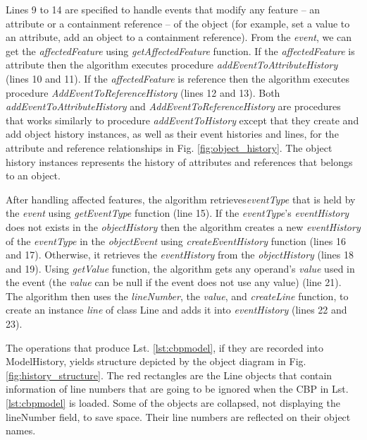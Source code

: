\documentclass[sigconf]{acmart}
\begin{document}
Lines 9 to 14 are specified to handle events that modify any feature -- an attribute or a containment reference -- of the object (for example, set a value to an attribute, add an object to a containment reference). From the \emph{event}, we can get the \emph{affectedFeature} using \emph{getAffectedFeature} function. If the \emph{affectedFeature} is attribute then the algorithm executes procedure \emph{addEventToAttributeHistory} (lines 10 and 11). If the \emph{affectedFeature} is reference then the algorithm executes procedure \emph{AddEventToReferenceHistory} (lines 12 and 13). Both \emph{addEventToAttributeHistory} and \emph{AddEventToReferenceHistory} are procedures that works similarly to procedure \emph{addEventToHistory} except that they create and add object history instances, as well as their event histories and lines, for the attribute and reference relationships in Fig. \ref{fig:object_history}. The object history instances represents the history of attributes and references that belongs to an object.

After handling affected features, the algorithm retrieves\emph{eventType} that is held by the \emph{event} using \emph{getEventType} function (line 15). If the \emph{eventType}'s \emph{eventHistory} does not exists in the \emph{objectHistory} then the algorithm creates a new \emph{eventHistory} of the \emph{eventType} in the \emph{objectEvent}  using \emph{createEventHistory} function (lines 16 and 17). Otherwise, it retrieves the \emph{eventHistory} from the \emph{objectHistory} (lines 18 and 19). Using \emph{getValue} function, the algorithm gets any operand's \emph{value} used in the event (the \emph{value} can be null if the event does not use any value) (line 21). The algorithm then uses the \emph{lineNumber}, the \emph{value}, and \emph{createLine} function, to create an instance \emph{line} of class Line and adds it into \emph{eventHistory} (lines 22 and 23).   

The operations that produce Lst. \ref{lst:cbpmodel}, if they are recorded into ModelHistory, yields structure depicted by the object diagram in Fig. \ref{fig:history_structure}. The red rectangles are the Line objects that contain information of line numbers that are going to be ignored when the CBP in Lst. \ref{lst:cbpmodel} is loaded. Some of the objects are collapsed, not displaying the lineNumber field, to save space. Their line numbers are reflected on their object names.  
\end{document}
